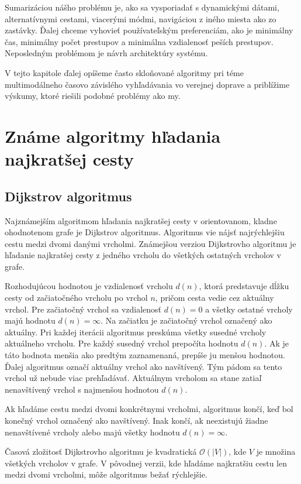Sumarizáciou nášho problému je, ako sa vysporiadať s dynamickými dátami, alternatívnymi cestami, viacerými módmi, navigáciou z iného miesta ako zo zastávky. Ďalej chceme vyhovieť používateľským preferenciám, ako je minimálny čas, minimálny počet prestupov a minimálna vzdialenosť peších prestupov. Neposledným problémom je návrh architektúry systému.

V tejto kapitole ďalej opíšeme často skloňované algoritmy pri téme multimodálneho časovo závislého vyhľadávania vo verejnej doprave a priblížime výskumy, ktoré riešili podobné problémy ako my.

\section{Známe algoritmy hľadania najkratšej cesty}
\subsection{Dijkstrov algoritmus}
Najznámejším algoritmom hľadania najkratšej cesty v orientovanom, kladne ohodnotenom grafe je Dijkstrov algoritmus. Algoritmus vie nájsť najrýchlejšiu cestu medzi dvomi danými vrcholmi. Známejšou verziou Dijkstrovho algoritmu je hľadanie najkratšej cesty z jedného vrcholu do všetkých ostatných vrcholov v grafe. 

Rozhodujúcou hodnotou je vzdialenosť vrcholu $d(n)$, ktorá predstavuje dĺžku cesty od začiatočného vrcholu po vrchol $n$, pričom cesta vedie cez aktuálny vrchol.
Pre začiatočný vrchol sa vzdialenosť $d(n) = 0$ a všetky ostatné vrcholy majú hodnotu $d(n) = \infty$. Na začiatku je začiatočný vrchol označený ako aktuálny. Pri každej iterácii algoritmus preskúma všetky susedné vrcholy aktuálneho vrcholu. Pre každý susedný vrchol prepočíta hodnotu $d(n)$. Ak je táto hodnota menšia ako predtým zaznamenaná, prepíše ju menšou hodnotou. Ďalej algoritmus označí aktuálny vrchol ako navštívený. Tým pádom sa tento vrchol už nebude viac prehľadávať. Aktuálnym vrcholom sa stane zatiaľ nenavštívený vrchol s najmenšou hodnotou $d(n)$. 

Ak hľadáme cestu medzi dvomi konkrétnymi vrcholmi, algoritmus končí, keď bol konečný vrchol označený ako navštívený. Inak končí, ak neexistujú žiadne nenavštívené vrcholy alebo majú všetky hodnotu $d(n) = \infty$.

Časová zložitosť Dijkstrovho algoritmu je kvadratická
$\mathcal{O}(|V|)$, kde $V$ je množina všetkých vrcholov v grafe. V pôvodnej verzii, kde hľadáme najkratšiu cestu len medzi dvomi vrcholmi, môže algoritmus bežať rýchlejšie.

